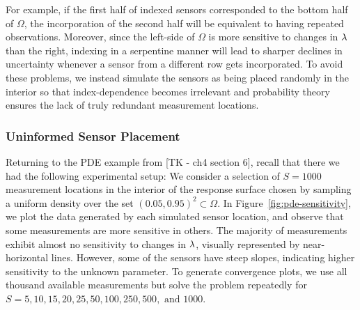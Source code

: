 For example, if the first half of indexed sensors corresponded to the bottom half of $\Omega$, the incorporation of the second half will be equivalent to having repeated observations.
Moreover, since the left-side of $\Omega$ is more sensitive to changes in $\lambda$ than the right, indexing in a serpentine manner will lead to sharper declines in uncertainty whenever a sensor from a different row gets incorporated.
To avoid these problems, we instead simulate the sensors as being placed randomly in the interior so that index-dependence becomes irrelevant and  probability theory ensures the lack of truly redundant measurement locations.

\subsubsection{Uninformed Sensor Placement}

Returning to the PDE example from [TK - ch4 section 6], recall that there we had the following experimental setup:
We consider a selection of $S=1000$ measurement locations in the interior of the response surface chosen by sampling a uniform density over the set $(0.05, 0.95)^2 \subset \Omega$.
In Figure~\ref{fig:pde-sensitivity}, we plot the data generated by each simulated sensor location, and observe that some measurements are more sensitive in others.
The majority of measurements exhibit almost no sensitivity to changes in $\lambda$, visually represented by near-horizontal lines.
However, some of the sensors have steep slopes, indicating higher sensitivity to the unknown parameter.
To generate convergence plots, we use all thousand available measurements but solve the problem repeatedly for $S = 5, 10, 15, 20, 25, 50, 100, 250, 500, \text{ and } 1000$.


